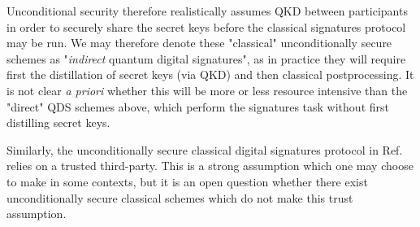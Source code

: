 Unconditional security therefore realistically assumes QKD between participants in order to securely share the secret keys before the classical signatures protocol may be run. We may therefore denote these "classical" unconditionally secure schemes as "\emph{indirect} quantum digital signatures", as in practice they will require first the distillation of secret keys (via QKD) and then classical postprocessing. It is not clear \emph{a priori} whether this will be more or less resource intensive than the "direct" QDS schemes above, which perform the signatures task without first distilling secret keys.

Similarly, the unconditionally secure classical digital signatures protocol in Ref.~\cite{Hanaoka2000} relies on a trusted third-party. This is a strong assumption which one may choose to make in some contexts, but it is an open question whether there exist unconditionally secure classical schemes which do not make this trust assumption.

%

